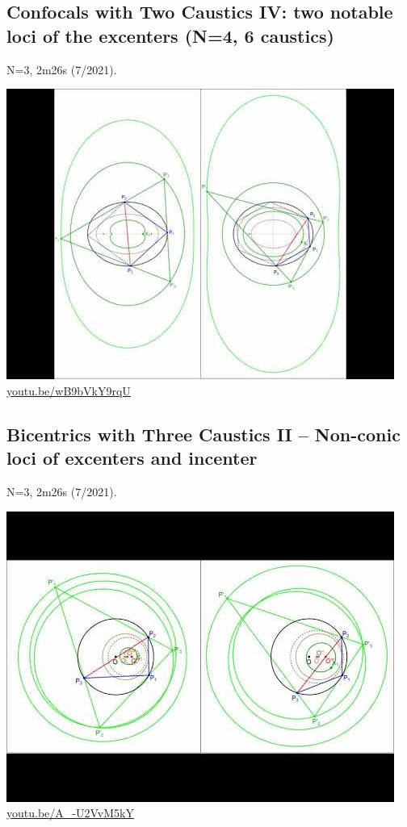 \documentclass[12pt]{amsart}
\begin{document}
\subsection{Confocals with Two Caustics IV: two notable loci of the excenters (N=4, 6 caustics)}
\label{vid:wB9bVkY9rqU}
\noindent N=3, 2m26s (7/2021). 
\begin{center}\includegraphics[width=.5\textwidth]{pics/wB9bVkY9rqU.jpg} \\ 
\href{https://youtu.be/wB9bVkY9rqU}{\url{youtu.be/wB9bVkY9rqU}}\end{center}
% 

\subsection{Bicentrics with Three Caustics II -- Non-conic loci of excenters and  incenter}
\label{vid:A_-U2VvM5kY}
\noindent N=3, 2m26s (7/2021). 
\begin{center}\includegraphics[width=.5\textwidth]{pics/A_-U2VvM5kY.jpg} \\ 
\href{https://youtu.be/A_-U2VvM5kY}{\url{youtu.be/A\_-U2VvM5kY}}\end{center}
% 
\end{document}
